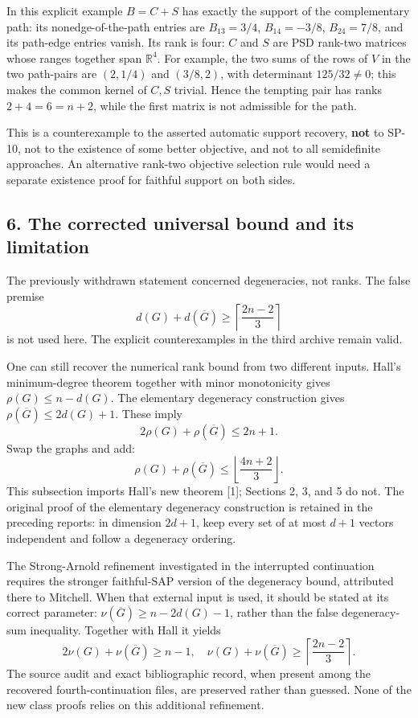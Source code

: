\documentclass[
  10pt,
]{article}
\begin{document}
In this explicit example \(B=C+S\) has exactly the support of the
complementary path: its nonedge-of-the-path entries are \(B_{13}=3/4\),
\(B_{14}=-3/8\), \(B_{24}=7/8\), and its path-edge entries vanish. Its
rank is four: \(C\) and \(S\) are PSD rank-two matrices whose ranges
together span \(\mathbb R^4\). For example, the two sums of the rows of
\(V\) in the two path-pairs are \((2,1/4)\) and \((3/8,2)\), with
determinant \(125/32\ne0\); this makes the common kernel of \(C,S\)
trivial. Hence the tempting pair has ranks \(2+4=6=n+2\), while the
first matrix is not admissible for the path.

This is a counterexample to the asserted automatic support recovery,
\textbf{not} to SP-10, not to the existence of some better objective,
and not to all semidefinite approaches. An alternative rank-two
objective selection rule would need a separate existence proof for
faithful support on both sides.

\subsection{6. The corrected universal bound and its
limitation}\label{the-corrected-universal-bound-and-its-limitation}

The previously withdrawn statement concerned degeneracies, not ranks.
The false premise \[
 d(G)+d(\overline G)\ge\left\lceil\frac{2n-2}{3}\right\rceil
\] is not used here. The explicit counterexamples in the third archive
remain valid.

One can still recover the numerical rank bound from two different
inputs. Hall's minimum-degree theorem together with minor monotonicity
gives \(\rho(G)\le n-d(G)\). The elementary degeneracy construction
gives \(\rho(\overline G)\le2d(G)+1\). These imply \[
 2\rho(G)+\rho(\overline G)\le2n+1.
\] Swap the graphs and add: \[
 \boxed{\rho(G)+\rho(\overline G)\le\left\lfloor\frac{4n+2}{3}\right\rfloor.}
\] This subsection imports Hall's new theorem {[}1{]}; Sections 2, 3,
and 5 do not. The original proof of the elementary degeneracy
construction is retained in the preceding reports: in dimension
\(2d+1\), keep every set of at most \(d+1\) vectors independent and
follow a degeneracy ordering.

The Strong-Arnold refinement investigated in the interrupted
continuation requires the stronger faithful-SAP version of the
degeneracy bound, attributed there to Mitchell. When that external input
is used, it should be stated at its correct parameter:
\(\nu(\overline G)\ge n-2d(G)-1\), rather than the false degeneracy-sum
inequality. Together with Hall it yields \[
 2\nu(G)+\nu(\overline G)\ge n-1,
\quad
 \nu(G)+\nu(\overline G)\ge\left\lceil\frac{2n-2}{3}\right\rceil.
\] The source audit and exact bibliographic record, when present among
the recovered fourth-continuation files, are preserved rather than
guessed. None of the new class proofs relies on this additional
refinement.
\end{document}
